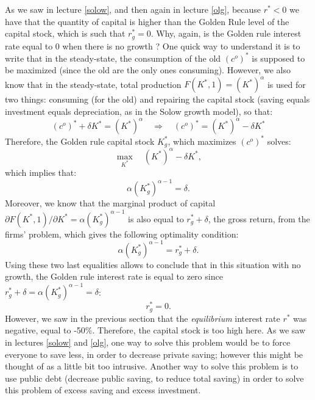 \documentclass[]{book}
\begin{document}
As we saw in lecture \ref{solow}, and then again in lecture \ref{olg},
because \(r^{*}<0\) we have that the quantity of capital is higher than
the Golden Rule level of the capital stock, which is such that
\(r^{*}_g=0\). Why, again, is the Golden rule interest rate equal to 0
when there is no growth ? One quick way to understand it is to write
that in the steady-state, the consumption of the old \((c^{o})^{*}\) is
supposed to be maximized (since the old are the only ones consuming).
However, we also know that in the steady-state, total production
\(F(K^{*}, 1) = (K^{*})^{\alpha}\) is used for two things: consuming
(for the old) and repairing the capital stock (saving equals investment
equals depreciation, as in the Solow growth model), so that:
\[(c^{o})^{*} + \delta K^{*} = (K^{*})^{\alpha} \quad \Rightarrow \quad (c^{o})^{*} = (K^{*})^{\alpha} -\delta K^{*} \]
Therefore, the Golden rule capital stock \(K^{*}_g\), which maximizes
\((c^{o})^{*}\) solves:
\[\max_{K^{*}}\quad (K^{*})^{\alpha}-\delta K^{*},\] which implies that:
\[\alpha (K^{*}_g)^{\alpha-1}=\delta.\] Moreover, we know that the
marginal product of capital
\(\partial F(K^{*}, 1)/\partial K^{*} = \alpha (K^{*}_g)^{\alpha-1}\) is
also equal to \(r^{*}_g+\delta\), the gross return, from the firms'
problem, which gives the following optimality condition:
\[\alpha (K^{*}_g)^{\alpha-1}=r^{*}_g+\delta.\] Using these two last
equalities allows to conclude that in this situation with no growth, the
Golden rule interest rate is equal to zero since
\(r^{*}_g+\delta = \alpha (K^{*}_g)^{\alpha-1} =\delta\): \[r^{*}_g=0.\]
However, we saw in the previous section that the \emph{equilibrium}
interest rate \(r^{*}\) was negative, equal to -50\%. Therefore, the
capital stock is too high here. As we saw in lectures \ref{solow} and
\ref{olg}, one way to solve this problem would be to force everyone to
save less, in order to decrease private saving; however this might be
thought of as a little bit too intrusive. Another way to solve this
problem is to use public debt (decrease public saving, to reduce total
saving) in order to solve this problem of excess saving and excess
investment.
\end{document}
